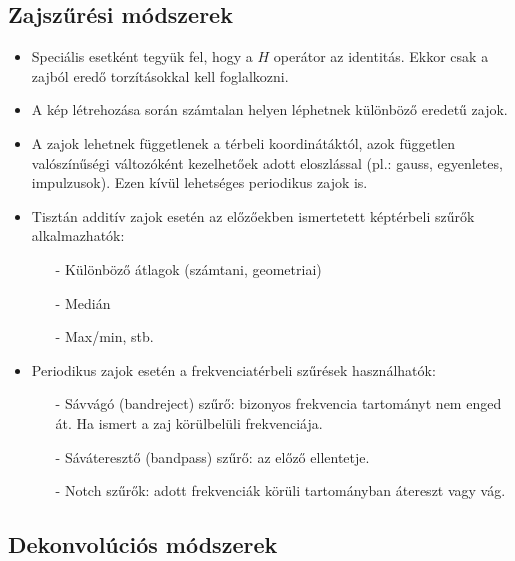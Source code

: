 \documentclass[12pt]{article}
\theoremstyle{plain}
\begin{document}
\subsection{Zajszűrési módszerek}

\begin{itemize}
    \item Speciális esetként tegyük fel, hogy a $H$ operátor az identitás. Ekkor csak a zajból eredő torzításokkal kell foglalkozni.
    \item A kép létrehozása során számtalan helyen léphetnek különböző eredetű zajok.
    \item A zajok lehetnek függetlenek a térbeli koordinátáktól, azok független valószínűségi változóként kezelhetőek adott eloszlással (pl.: gauss, egyenletes, impulzusok). Ezen kívül lehetséges periodikus zajok is.
    \\
    \item Tisztán additív zajok esetén az előzőekben ismertetett képtérbeli szűrők alkalmazhatók:
    \begin{itemize}
        \item[-] Különböző átlagok (számtani, geometriai)
        \item[-] Medián
        \item[-] Max/min, stb.
    \end{itemize}{}
    \item Periodikus zajok esetén a frekvenciatérbeli szűrések használhatók:
    \begin{itemize}
        \item[-] Sávvágó (bandreject) szűrő: bizonyos frekvencia tartományt nem enged át. Ha ismert a zaj körülbelüli frekvenciája. 
        \item[-] Sáváteresztő (bandpass) szűrő: az előző ellentetje. 
        \item[-] Notch szűrők: adott frekvenciák körüli tartományban átereszt vagy vág.
    \end{itemize}{}
\end{itemize}{}

\subsection{Dekonvolúciós módszerek}
\end{document}

